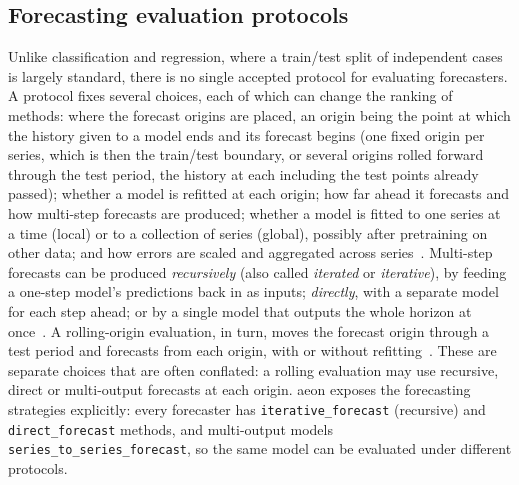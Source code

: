 
\subsection{Forecasting evaluation protocols}
\label{sec:protocols}

Unlike classification and regression, where a train/test split of independent
cases is largely standard, there is no single accepted protocol for evaluating
forecasters. A protocol fixes several choices, each of which can change the
ranking of methods: where the forecast origins are placed, an origin being the
point at which the history given to a model ends and its forecast begins (one
fixed origin per series, which is then the train/test boundary, or several
origins rolled forward through the test period, the history at each including
the test points already passed); whether a model is refitted at each origin; how far
ahead it forecasts and how multi-step forecasts are produced; whether a model
is fitted to one series at a time (local) or to a collection of series
(global), possibly after pretraining on other data; and how errors are scaled
and aggregated across series~\citep{tashman2000outofsample,hewamalage2023forecast}.
Multi-step forecasts can be produced \emph{recursively} (also called
\emph{iterated} or \emph{iterative}), by feeding a one-step model's predictions
back in as inputs; \emph{directly}, with a separate model for each step ahead;
or by a single model that outputs the whole horizon at
once~\citep{taieb2012review}. A rolling-origin evaluation, in turn, moves the
forecast origin through a test period and forecasts from each origin, with or
without refitting~\citep{tashman2000outofsample}. These are separate choices
that are often conflated: a rolling evaluation may use recursive, direct or
multi-output forecasts at each origin. aeon exposes the forecasting strategies
explicitly: every forecaster has \texttt{iterative\_forecast} (recursive) and
\texttt{direct\_forecast} methods, and multi-output models
\texttt{series\_to\_series\_forecast}, so the same model can be evaluated
under different protocols.

